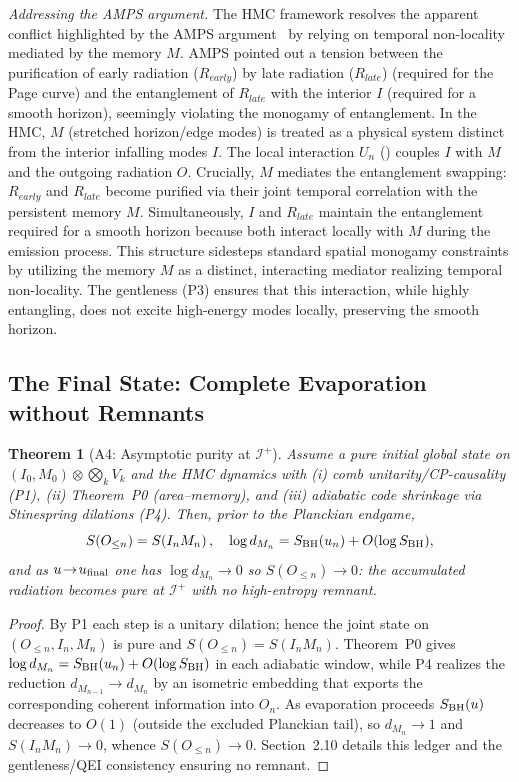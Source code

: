 \documentclass[11pt,a4paper]{article}
\newcommand{\HMC}{\textsc{HMC}\xspace}
\theoremstyle{plain}
\newtheorem{theorem}{Theorem}
\theoremstyle{definition}
\theoremstyle{remark}
\begin{document}
\textit{Addressing the AMPS argument.} The \HMC{} framework resolves the apparent conflict highlighted by the AMPS argument~\cite{AMPS:2013} by relying on temporal non-locality mediated by the memory $M$. AMPS pointed out a tension between the purification of early radiation ($R_{early}$) by late radiation ($R_{late}$) (required for the Page curve) and the entanglement of $R_{late}$ with the interior $I$ (required for a smooth horizon), seemingly violating the monogamy of entanglement. In the \HMC{}, $M$ (stretched horizon/edge modes) is treated as a physical system distinct from the interior infalling modes $I$. The local interaction $U_n$ () couples $I$ with $M$ and the outgoing radiation $O$. Crucially, $M$ mediates the entanglement swapping: $R_{early}$ and $R_{late}$ become purified via their joint temporal correlation with the persistent memory $M$. Simultaneously, $I$ and $R_{late}$ maintain the entanglement required for a smooth horizon because both interact locally with $M$ during the emission process. This structure sidesteps standard spatial monogamy constraints by utilizing the memory $M$ as a distinct, interacting mediator realizing temporal non-locality. The gentleness (P3) ensures that this interaction, while highly entangling, does not excite high-energy modes locally, preserving the smooth horizon.

\subsection{The Final State: Complete Evaporation without Remnants}
\label{sec:end_state}

\begin{theorem}[A4: Asymptotic purity at $\mathscr I^+$]\label{thm:A4}
Assume a pure initial global state on $(I_0,M_0)\otimes\bigotimes_k V_k$ and the HMC dynamics with (i) comb unitarity/CP-causality (P1), (ii) Theorem~P0 (area--memory), and (iii) adiabatic code shrinkage via Stinespring dilations (P4). Then, prior to the Planckian endgame,
\[
S\!\left(O_{\le n}\right)=S\!\left(I_n M_n\right),
\quad
\log d_{M_n}=S_{\rm BH}(u_n)+O(\log S_{\rm BH}),
\]
and as $u\!\to\! u_{\rm final}$ one has $\log d_{M_n}\!\to\!0$ so $S(O_{\le n})\!\to\!0$: the accumulated radiation becomes pure at $\mathscr I^+$ with no high-entropy remnant.
\end{theorem}

\begin{proof}
By P1 each step is a unitary dilation; hence the joint state on $(O_{\le n},I_n,M_n)$ is pure and $S(O_{\le n})=S(I_nM_n)$. Theorem~P0 gives $\log d_{M_n}=S_{\rm BH}(u_n)+O(\log S_{\rm BH})$ in each adiabatic window, while P4 realizes the reduction $d_{M_{n-1}}\!\to d_{M_n}$ by an isometric embedding that exports the corresponding coherent information into $O_n$. As evaporation proceeds $S_{\rm BH}(u)$ decreases to $O(1)$ (outside the excluded Planckian tail), so $d_{M_n}\to 1$ and $S(I_nM_n)\to 0$, whence $S(O_{\le n})\to 0$. Section~2.10 details this ledger and the gentleness/QEI consistency ensuring no remnant. 
\end{proof}
\end{document}
